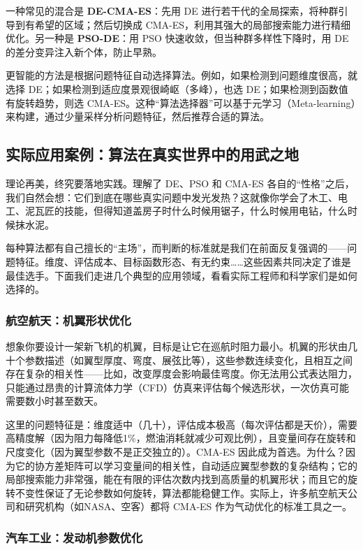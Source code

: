 \documentclass[lang=cn,zihao=-4,a4paper,fontset=windows]{beautybook}
\begin{document}
一种常见的混合是 \textbf{DE-CMA-ES}：先用 DE 进行若干代的全局探索，将种群引导到有希望的区域；然后切换成 CMA-ES，利用其强大的局部搜索能力进行精细优化。另一种是 \textbf{PSO-DE}：用 PSO 快速收敛，但当种群多样性下降时，用 DE 的差分变异注入新个体，防止早熟。

更智能的方法是根据问题特征自动选择算法。例如，如果检测到问题维度很高，就选择 DE；如果检测到适应度景观很崎岖（多峰），也选 DE；如果检测到函数值有旋转趋势，则选 CMA-ES。这种“算法选择器”可以基于元学习（Meta-learning）来构建，通过少量采样分析问题特征，然后推荐合适的算法。

\subsection{实际应用案例：算法在真实世界中的用武之地}

理论再美，终究要落地实践。理解了 DE、PSO 和 CMA-ES 各自的“性格”之后，我们自然会想：它们到底在哪些真实问题中发光发热？这就像你学会了木工、电工、泥瓦匠的技能，但得知道盖房子时什么时候用锯子，什么时候用电钻，什么时候抹水泥。

每种算法都有自己擅长的“主场”，而判断的标准就是我们在前面反复强调的——问题特征。维度、评估成本、目标函数形态、有无约束……这些因素共同决定了谁是最佳选手。下面我们走进几个典型的应用领域，看看实际工程师和科学家们是如何选择的。

\subsubsection{航空航天：机翼形状优化}

想象你要设计一架新飞机的机翼，目标是让它在巡航时阻力最小。机翼的形状由几十个参数描述（如翼型厚度、弯度、展弦比等），这些参数连续变化，且相互之间存在复杂的相关性——比如，改变厚度会影响最佳弯度。你无法用公式表达阻力，只能通过昂贵的计算流体力学（CFD）仿真来评估每个候选形状，一次仿真可能需要数小时甚至数天。

这里的问题特征是：维度适中（几十），评估成本极高（每次评估都是天价），需要高精度解（因为阻力每降低1\%，燃油消耗就减少可观比例），且变量间存在旋转和尺度变化（因为翼型参数不是正交独立的）。CMA-ES 因此成为首选。为什么？因为它的协方差矩阵可以学习变量间的相关性，自动适应翼型参数的复杂结构；它的局部搜索能力非常强，能在有限的评估次数内找到高质量的机翼形状；而且它的旋转不变性保证了无论参数如何旋转，算法都能稳健工作。实际上，许多航空航天公司和研究机构（如NASA、空客）都将 CMA-ES 作为气动优化的标准工具之一。

\subsubsection{汽车工业：发动机参数优化}
\end{document}
